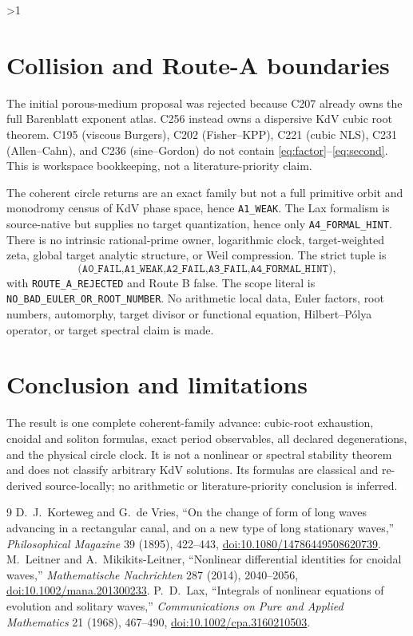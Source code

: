 \documentclass[10pt]{article}
\begin{document}
\ifnum\CRevisionRound>1
\section{Collision and Route-A boundaries}
The initial porous-medium proposal was rejected because C207 already owns
the full Barenblatt exponent atlas.  C256 instead owns a dispersive KdV cubic
root theorem.  C195 (viscous Burgers), C202 (Fisher--KPP), C221 (cubic NLS),
C231 (Allen--Cahn), and C236 (sine--Gordon) do not contain
\eqref{eq:factor}--\eqref{eq:second}.  This is workspace bookkeeping, not a
literature-priority claim.

The coherent circle returns are an exact family but not a full primitive
orbit and monodromy census of KdV phase space, hence
\texttt{A1\_WEAK}.  The Lax formalism is source-native but supplies no target
quantization, hence only \texttt{A4\_FORMAL\_HINT}.  There is no intrinsic
rational-prime owner, logarithmic clock, target-weighted zeta, global target
analytic structure, or Weil compression.  The strict tuple is
\[
\texttt{(A0\_FAIL,A1\_WEAK,A2\_FAIL,A3\_FAIL,A4\_FORMAL\_HINT)},
\]
with \texttt{ROUTE\_A\_REJECTED} and Route B false.  The scope literal is
\texttt{NO\_BAD\_EULER\_OR\_ROOT\_NUMBER}.  No arithmetic local data, Euler
factors, root numbers, automorphy, target divisor or functional equation,
Hilbert--Pólya operator, or target spectral claim is made.
\fi

\section{Conclusion and limitations}
The result is one complete coherent-family advance: cubic-root exhaustion,
cnoidal and soliton formulas, exact period observables, all declared
degenerations, and the physical circle clock.  It is not a nonlinear or
spectral stability theorem and does not classify arbitrary KdV solutions.
Its formulas are classical and re-derived source-locally; no arithmetic or
literature-priority conclusion is inferred.

\begin{thebibliography}{9}
 D.~J.~Korteweg and G.~de Vries, ``On the change of form of
long waves advancing in a rectangular canal, and on a new type of long
stationary waves,'' \emph{Philosophical Magazine} 39 (1895), 422--443,
\href{https://doi.org/10.1080/14786449508620739}{doi:10.1080/14786449508620739}.
 M.~Leitner and A.~Mikikits-Leitner, ``Nonlinear
differential identities for cnoidal waves,'' \emph{Mathematische
Nachrichten} 287 (2014), 2040--2056,
\href{https://doi.org/10.1002/mana.201300233}{doi:10.1002/mana.201300233}.
 P.~D.~Lax, ``Integrals of nonlinear equations of evolution
and solitary waves,'' \emph{Communications on Pure and Applied Mathematics}
21 (1968), 467--490,
\href{https://doi.org/10.1002/cpa.3160210503}{doi:10.1002/cpa.3160210503}.
\end{thebibliography}
\end{document}
